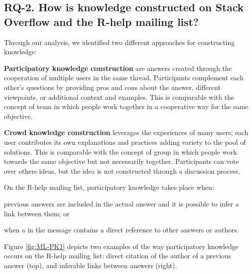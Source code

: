 \subsection{RQ-2. How is knowledge constructed on Stack Overflow and the R-help mailing list?}
\label{sec:rq2}

    Through our analysis, we identified two different approaches for constructing knowledge:

        \noindent\textbf{Participatory knowledge construction} are answers created through the cooperation of multiple users in the same thread.
        Participants complement each other's questions by providing pros and cons about the answer, different viewpoints, or additional context and examples.
        This is comparable with the concept of team in which people work together in a cooperative way for the same objective.

\noindent        \textbf{Crowd knowledge construction} leverages the experiences of many users; each user contributes its own explanations and practices adding variety to the pool of solutions.
        This is comparable with the concept of group in which people work towards the same objective but not necessarily together.
        Participants can vote over others ideas, but the idea is not constructed through a discussion process.
    
    On the R-help mailing list, participatory knowledge takes place when:
    \begin{enumerate*}[label=(\arabic*)]
    \item previous answers are included in the actual answer and it is possible to infer a link between them; or
    \item when a in the message contains a direct reference to other answers or authors.
    \end{enumerate*}
    Figure \ref{fig:ML-PK1} depicts two examples of the way participatory knowledge occurs on the R-help mailing list:
    direct citation of the author of a previous answer (top), and inferable links between answers (right).

